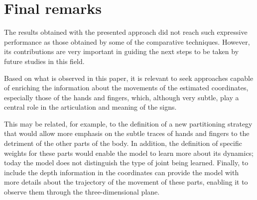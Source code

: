 \section{Final remarks} 
\label{sec:final-remarks}

The results obtained with the presented approach did not reach such expressive performance as those obtained by some of the comparative techniques. However, its contributions are very important in guiding the next steps to be taken by future studies in this field.

Based on what is observed in this paper, it is relevant to seek approaches capable of enriching the information about the movements of the estimated coordinates, especially those of the hands and fingers, which, although very subtle, play a central role in the articulation and meaning of the signs.

This may be related, for example, to the definition of a new partitioning strategy that would allow more emphasis on the subtle traces of hands and fingers to the detriment of the other parts of the body. In addition, the definition of specific weights for these parts would enable the model to learn more about its dynamics; today the model does not distinguish the type of joint being learned. Finally, to include the depth information in the coordinates can provide the model with more details about the trajectory of the movement of these parts, enabling it to observe them through the three-dimensional plane.





